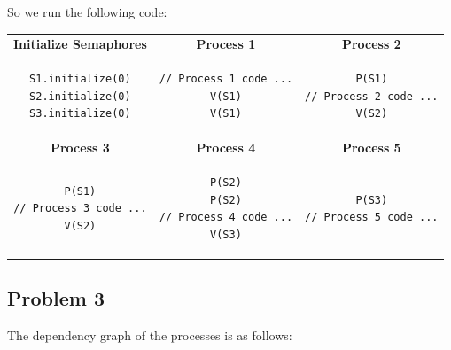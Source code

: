 \documentclass[english]{article}
\begin{document}
So we run the following code:
\begin{table}[H]
\begin{tabular}{|c|c|c|}
\hline
\textbf{Initialize Semaphores} & \textbf{Process 1} & \textbf{Process 2}  \\

\begin{lstlisting}
S1.initialize(0)
S2.initialize(0)
S3.initialize(0)
\end{lstlisting}
 & 
 \begin{lstlisting}
// Process 1 code ...
V(S1)
V(S1)
\end{lstlisting}
& 
\begin{lstlisting}
P(S1)
// Process 2 code ...
V(S2)
\end{lstlisting} \\ \hline \hline
\textbf{Process 3} & \textbf{Process 4} & \textbf{Process 5} \\

\begin{lstlisting}
P(S1)
// Process 3 code ...
V(S2)
\end{lstlisting}
& 
\begin{lstlisting}
P(S2)
P(S2)
// Process 4 code ...
V(S3)
\end{lstlisting}
&
\begin{lstlisting}
P(S3)
// Process 5 code ...
\end{lstlisting} \\\hline


\end{tabular}
\end{table}


\subsection*{Problem 3}
The dependency graph of the processes is as follows:

\begin{figure}[H]
\end{figure}
\end{document}
